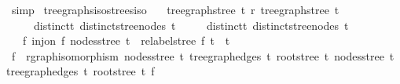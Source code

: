 \begin{isabellebody}
\ simp%
\endisatagproof
{\isafoldproof}%
%
\isadelimproof
\isanewline
%
\endisadelimproof
\isanewline
{}\isamarkupfalse%
\ tree{\isacharunderscore}{\kern0pt}graphs{\isacharunderscore}{\kern0pt}iso{\isacharunderscore}{\kern0pt}strees{\isacharunderscore}{\kern0pt}iso{\isacharcolon}{\kern0pt}\isanewline
\ \ \ {\isachardoublequoteopen}tree{\isacharunderscore}{\kern0pt}graph{\isacharunderscore}{\kern0pt}stree\ t{}\ {\isasymsimeq}\isactrlsub r\ tree{\isacharunderscore}{\kern0pt}graph{\isacharunderscore}{\kern0pt}stree\ t{}{\isachardoublequoteclose}\isanewline
\ \ \ \ \ distinct{\isacharunderscore}{\kern0pt}t{}{\isacharcolon}{\kern0pt}\ {\isachardoublequoteopen}distinct{\isacharunderscore}{\kern0pt}stree{\isacharunderscore}{\kern0pt}nodes\ t{}{\isachardoublequoteclose}\isanewline
\ \ \ \ \ distinct{\isacharunderscore}{\kern0pt}t{}{\isacharcolon}{\kern0pt}\ {\isachardoublequoteopen}distinct{\isacharunderscore}{\kern0pt}stree{\isacharunderscore}{\kern0pt}nodes\ t{}{\isachardoublequoteclose}\isanewline
\ \ \ {\isachardoublequoteopen}{\isasymexists}f{\isachardot}{\kern0pt}\ inj{\isacharunderscore}{\kern0pt}on\ f\ {\isacharparenleft}{\kern0pt}nodes{\isacharunderscore}{\kern0pt}stree\ t{}{\isacharparenright}{\kern0pt}\ {\isasymand}\ relabel{\isacharunderscore}{\kern0pt}stree\ f\ t{}\ {\isacharequal}{\kern0pt}\ t{}{\isachardoublequoteclose}\isanewline
%
\isadelimproof
%
\endisadelimproof
%
\isatagproof
{}\isamarkupfalse%
{\isacharminus}{\kern0pt}\isanewline
\ \ \isamarkupfalse%
\ f\ \ {\isachardoublequoteopen}rgraph{\isacharunderscore}{\kern0pt}isomorphism\ {\isacharparenleft}{\kern0pt}nodes{\isacharunderscore}{\kern0pt}stree\ t{}{\isacharparenright}{\kern0pt}\ {\isacharparenleft}{\kern0pt}tree{\isacharunderscore}{\kern0pt}graph{\isacharunderscore}{\kern0pt}edges\ t{}{\isacharparenright}{\kern0pt}\ {\isacharparenleft}{\kern0pt}root{\isacharunderscore}{\kern0pt}stree\ t{}{\isacharparenright}{\kern0pt}\ {\isacharparenleft}{\kern0pt}nodes{\isacharunderscore}{\kern0pt}stree\ t{}{\isacharparenright}{\kern0pt}\ {\isacharparenleft}{\kern0pt}tree{\isacharunderscore}{\kern0pt}graph{\isacharunderscore}{\kern0pt}edges\ t{}{\isacharparenright}{\kern0pt}\ {\isacharparenleft}{\kern0pt}root{\isacharunderscore}{\kern0pt}stree\ t{}{\isacharparenright}{\kern0pt}\ f{\isachardoublequoteclose}\isanewline

\end{isabellebody}
